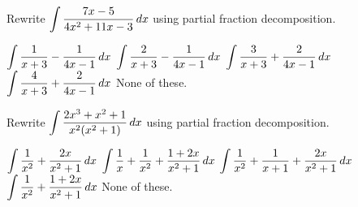\documentclass[12pt]{exam}
\newcommand{\ds}{\ensuremath{\displaystyle}}
\begin{document}
\begin{center}
\end{center}
\vspace{0.1in}

\begin{questions}

\setcounter{question}{0}
\question[10]
Rewrite $\ds \int \frac{7x-5}{4x^2+11x-3} \, dx$ using
partial fraction decomposition.

\begin{checkboxes}
\choice $\ds \int \frac{1}{x+3}-\frac{1}{4x-1} \, dx$
\CorrectChoice $\ds \int \frac{2}{x+3}-\frac{1}{4x-1} \, dx$
\choice $\ds \int \frac{3}{x+3}+\frac{2}{4x-1} \, dx$
\choice $\ds \int \frac{4}{x+3}+\frac{2}{4x-1} \, dx$
\choice None of these.
\end{checkboxes}

\vfill

\question[10]
Rewrite $\ds \int \frac{2x^3+x^2+1}{x^2(x^2+1)} \, dx$ using
partial fraction decomposition.

\begin{checkboxes}
\CorrectChoice $\ds \int \frac{1}{x^2}+\frac{2x}{x^2+1} \, dx$
\choice $\ds \int \frac{1}{x}+\frac{1}{x^2}+\frac{1+2x}{x^2+1} \, dx$
\choice $\ds \int \frac{1}{x^2}+\frac{1}{x+1}+\frac{2x}{x^2+1} \, dx$
\choice $\ds \int \frac{1}{x^2}+\frac{1+2x}{x^2+1} \, dx$
\choice None of these.
\end{checkboxes}

\vfill

\end{questions}
\end{document}
